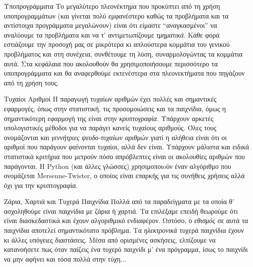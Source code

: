 \documentclass[a4paper,11pt,oneside]{book}
\begin{document}
\begin{theory}{Υποπρογράμματα}
Το μεγαλύτερο πλεονέκτημα που προκύπτει από τη χρήση υποπρογραμμάτων (και γίνεται πολύ εμφανέστερο καθώς τα προβλήματα και τα αντίστοιχα προγράμματα μεγαλώνουν) είναι ότι είμαστε ``αναγκασμένοι'' να αναλύουμε τα προβλήματα και να τ' αντιμετωπίζουμε \emph{τμηματικά}. Κάθε φορά εστιάζουμε την προσοχή μας σε μικρότερα κι απλούστερα κομμάτια του γενικού προβλήματος και στη συνέχεια, συνθέτουμε τη λύση, συναρμολογώντας τα κομμάτια αυτά. Στα κεφάλαια που ακολουθούν θα χρησιμοποιήσουμε περισσότερο τα υποπρογράμματα και θα αναφερθούμε εκτενέστερα στα πλεονεκτήματα που πηγάζουν από τη χρήση τους.
\end{theory}

\begin{theory}{Τυχαίοι Αριθμοί}
Η παραγωγή τυχαίων αριθμών έχει πολλές και σημαντικές εφαρμογές, όπως στην στατιστική, τις προσομοιώσεις και τα παιχνίδια, όμως η σημαντικότερη εφαρμογή της είναι στην \emph{κρυπτογραφία}. Υπάρχουν αρκετές υπολογιστικές μέθοδοι για να παράγει κανείς τυχαίους αριθμούς. Όλες τους ονομάζονται και \emph{γεννήτριες ψευδο-τυχαίων αριθμών} γιατί η αλήθεια είναι ότι οι αριθμοί που παράγουν \emph{φαίνονται} τυχαίοι, αλλά δεν είναι. Υπάρχουν μάλιστα και ειδικά στατιστικά κριτήρια που μετρούν πόσο απρόβλεπτες είναι οι ακολουθίες αριθμών που παράγονται. Η Python (και άλλες γλώσσες) χρησιμοποιoύν έναν αλγόριθμο που ονομάζεται Mersenne-Twister, ο οποίος είναι επαρκής για τις συνήθεις χρήσεις αλλά όχι για την κρυπτογραφία.
\end{theory}

\begin{theory}{Ζάρια, Χαρτιά και Τυχερά Παιχνίδια}
Πολλά από τα παραδείγματα με τα οποία θ' ασχοληθούμε είναι παιχνίδια με ζάρια ή χαρτιά. Τα επιλέξαμε επειδή θεωρούμε ότι είναι διασκεδαστικά και έχουν αλγοριθμικό ενδιαφέρον. Ωστόσο, ο \emph{εθισμός} σε αυτά τα παιχνίδια αποτελεί σημαντικότατο πρόβλημα. Τα \emph{ηλεκτρονικά} τυχερά παιχνίδια έχουν κι άλλες υπόγειες διαστάσεις. Μέσα από ορισμένες ασκήσεις, ελπίζουμε να κατανοήσετε πως όταν παίζεις ένα τυχερό παιχνίδι μ' ένα πρόγραμμα, ίσως το παιχνίδι να μην αφήνει και τόσα πολλά στην τύχη...
\end{theory}

\hrulefill
\end{document}
